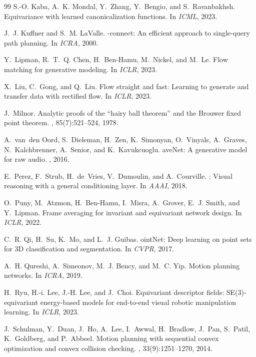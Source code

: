 \documentclass[10pt,twocolumn,letterpaper]{article}
\theoremstyle{plain}
\begin{document}
\begin{thebibliography}{99}
S.-O. Kaba, A.~K. Mondal, Y.~Zhang, Y.~Bengio, and S.~Ravanbakhsh.
\newblock Equivariance with learned canonicalization functions.
\newblock In {\em ICML}, 2023.

J.~J. Kuffner and S.~M. LaValle.
-connect: An efficient approach to single-query path planning.
\newblock In {\em ICRA}, 2000.

Y.~Lipman, R.~T.~Q. Chen, H.~Ben-Hamu, M.~Nickel, and M.~Le.
\newblock Flow matching for generative modeling.
\newblock In {\em ICLR}, 2023.

X.~Liu, C.~Gong, and Q.~Liu.
\newblock Flow straight and fast: Learning to generate and transfer data with
  rectified flow.
\newblock In {\em ICLR}, 2023.

J.~Milnor.
\newblock Analytic proofs of the ``hairy ball theorem'' and the {B}rouwer fixed
  point theorem.
, 85(7):521--524, 1978.

A.~van~den Oord, S.~Dieleman, H.~Zen, K.~Simonyan, O.~Vinyals, A.~Graves,
  N.~Kalchbrenner, A.~Senior, and K.~Kavukcuoglu.
ave{N}et: A generative model for raw audio.
, 2016.

E.~Perez, F.~Strub, H.~de~Vries, V.~Dumoulin, and A.~Courville.
: Visual reasoning with a general conditioning layer.
\newblock In {\em AAAI}, 2018.

O.~Puny, M.~Atzmon, H.~Ben-Hamu, I.~Misra, A.~Grover, E.~J. Smith, and
  Y.~Lipman.
\newblock Frame averaging for invariant and equivariant network design.
\newblock In {\em ICLR}, 2022.

C.~R. Qi, H.~Su, K.~Mo, and L.~J. Guibas.
oint{N}et: Deep learning on point sets for 3{D} classification and
  segmentation.
\newblock In {\em CVPR}, 2017.

A.~H. Qureshi, A.~Simeonov, M.~J. Bency, and M.~C. Yip.
\newblock Motion planning networks.
\newblock In {\em ICRA}, 2019.

H.~Ryu, H.-i. Lee, J.-H. Lee, and J.~Choi.
\newblock Equivariant descriptor fields: {SE(3)}-equivariant energy-based models
  for end-to-end visual robotic manipulation learning.
\newblock In {\em ICLR}, 2023.

J.~Schulman, Y.~Duan, J.~Ho, A.~Lee, I.~Awwal, H.~Bradlow, J.~Pan, S.~Patil,
  K.~Goldberg, and P.~Abbeel.
\newblock Motion planning with sequential convex optimization and convex
  collision checking.
, 33(9):1251--1270, 2014.


\end{thebibliography}
\end{document}
